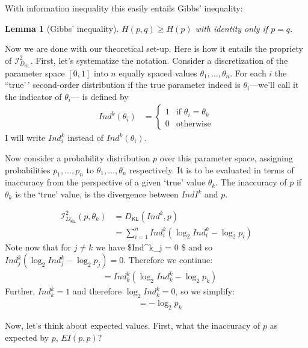 \documentclass[
  letterpaper,
  DIV=11,
  numbers=noendperiod]{scrartcl}
\newcommand{\dkl}{D_{\mathsf{KL}}} %
\newtheorem{lemma}{Lemma}
\begin{document}
With information inequality this easily entails Gibbs' inequality:

\begin{lemma}[Gibbs' inequality] $H(p,q) \geq H(p)$ with identity only if $p = q$.
\end{lemma}

Now we are done with our theoretical set-up. Here is how it entails the
propriety of \(\mathcal{I}_{\dkl}^2\). First, let's systematize the
notation. Consider a discretization of the parameter space \([0,1]\)
into \(n\) equally spaced values \(\theta_1, \dots, \theta_n\). For each
\(i\) the ``true'\,' second-order distribution if the true parameter
indeed is \(\theta_i\)---we'll call it the indicator of \(\theta_i\)---
is defined by \begin{align*}
Ind^k(\theta_i) & = \begin{cases} 1 & \mbox{if } \theta_i = \theta_k\\
                        0 & \mbox{otherwise}  \end{cases}
\end{align*} \noindent I will write \(Ind^k_i\) instead of
\(Ind^k(\theta_i)\).

Now consider a probability distribution \(p\) over this parameter space,
assigning probabilities \(p_1, \dots, p_n\) to
\(\theta_1, \dots, \theta_n\) respectively. It is to be evaluated in
terms of inaccuracy from the perspective of a given `true' value
\(\theta_k\). The inaccuracy of \(p\) if \(\theta_k\) is the `true'
value, is the divergence between \(IndI^k\) and \(p\).

\begin{align*}
\mathcal{I}_{\dkl}^2(p, \theta_k) & = \dkl(Ind^k,p) \\
& = \sum_{i=1}^n Ind^k_i \left( \log_2 Ind^k_i - \log_2 p_i \right)
\end{align*} Note now that for \(j \neq k\) we have \$Ind\^{}k\_j = 0 \$
and so \(Ind^k_j \left( \log_2 Ind^k_j - \log_2 p_j \right)=0\).
Therefore we continue: \begin{align*}
& = Ind^k_k \left( \log_2 Ind^k_k - \log_2 p_k \right)
\end{align*} Further, \(Ind^k_k= 1\) and therefore
\(\log_2 Ind^k_k =0\), so we simplify: \begin{align*}
& =  - \log_2 p_k
\end{align*}

\noindent Now, let's think about expected values. First, what the
inaccuracy of \(p\) as expected by \(p\), \(EI(p,p)\)?
\end{document}
